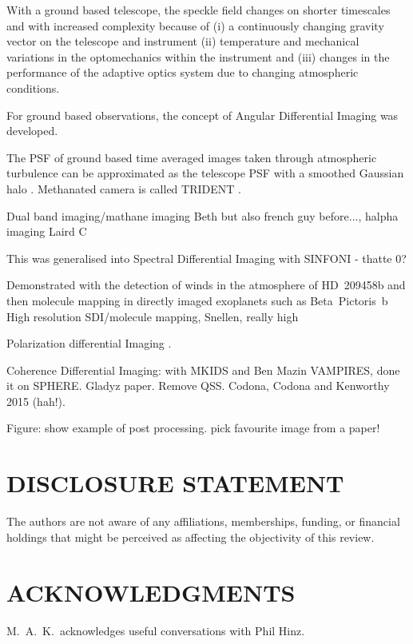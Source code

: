\documentclass[letterpaper]{ar-1col}
\begin{document}
With a ground based telescope, the speckle field changes on shorter timescales and with increased complexity because of (i) a continuously changing gravity vector on the telescope and instrument (ii) temperature and mechanical variations in the optomechanics within the instrument and (iii) changes in the performance of the adaptive optics system due to changing atmospheric conditions.

For ground based observations, the concept of Angular Differential Imaging \citep[ADI; ][]{Marois06} was developed.

The PSF of ground based time averaged images taken through atmospheric turbulence can be approximated as the telescope PSF with a smoothed Gaussian halo \citep{Marois00}.
%
Methanated camera is called TRIDENT \citep{Marois05}.

Dual band imaging/mathane imaging Beth but also french guy before..., halpha imaging Laird C

This was generalised into Spectral Differential Imaging with SINFONI - thatte 0?
\citet{Thatte07}

Demonstrated with the detection of winds in the atmosphere of HD~209458b \citep{Snellen10} and then molecule mapping in directly imaged exoplanets such as Beta~Pictoris~b \citep{Hoeijmakers18}
High resolution SDI/molecule mapping, Snellen, really high

Polarization differential Imaging \citep{Gledhill91}.

Coherence Differential Imaging: with MKIDS and Ben Mazin VAMPIRES, done it on SPHERE.
Gladyz paper. Remove QSS. Codona, Codona and Kenworthy 2015 (hah!).

Figure: show example of post processing. pick favourite image from a paper!

\lipsum[2-4]

\section*{DISCLOSURE STATEMENT}
The authors are not aware of any affiliations, memberships, funding, or financial holdings that
might be perceived as affecting the objectivity of this review.

\section*{ACKNOWLEDGMENTS}
M.\ A.\ K.\ acknowledges useful conversations with
Phil Hinz.
\end{document}
